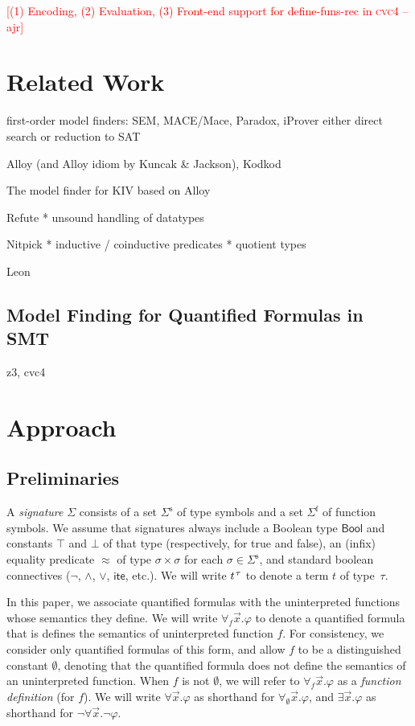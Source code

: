 \documentclass[runningheads,a4paper]{llncs}
\newcommand{\con}[1]{\mathsf{#1}}
\newcommand{\cvc}{\textsc{cvc}{\small 4}\xspace}
\newcommand{\teq}{\approx}
\newcommand{\ssorts}[1]{#1^\mathrm{s}}
\newcommand{\sfuns}[1]{#1^\mathrm{f}}
\newcommand{\Bool}{\con{Bool}}
\newcommand{\ltrue}{\top}
\newcommand{\lfalse}{\bot}
\newcommand{\lite}{\con{ite}}
\newcommand{\forallf}[1]{\forall_{#1}}
\newcommand{\fnull}{\emptyset}
\newcommand{\rem}[1]{\textcolor{red}{[#1]}}
\newcommand{\ajr}[1]{\rem{#1 --ajr}}
\newcommand{\vthinspace}{\kern+0.083333em}
\newcommand{\typ}[1]{^{\vthinspace #1}}
\begin{document}
\ajr{(1) Encoding, (2) Evaluation, (3) Front-end support for define-funs-rec in \cvc}

\section{Related Work}

first-order model finders: SEM, MACE/Mace, Paradox, iProver
  either direct search or reduction to SAT

Alloy (and Alloy idiom by Kuncak \& Jackson), Kodkod

The model finder for KIV based on Alloy

Refute
  * unsound handling of datatypes

Nitpick
  * inductive / coinductive predicates
  * quotient types

Leon

\subsection{Model Finding for Quantified Formulas in SMT}

z3, cvc4


\section{Approach}

\subsection{Preliminaries}
\label{sec:prelim}

A \emph{signature} $\Sigma$ consists of 
a set $\ssorts{\Sigma}$ of type symbols and
a set $\sfuns{\Sigma}$ of function symbols.
We assume that signatures always include a Boolean type $\Bool$ and constants 
$\ltrue$ and $\lfalse$ of that type (respectively, for true and false), 
an (infix) equality predicate $\teq$ of type $\sigma \times \sigma$ for each $\sigma \in \ssorts{\Sigma}$,
and standard boolean connectives ($\neg$, $\wedge$, $\vee$, $\lite$, etc.).
We will write $t\typ{\tau}$ to denote a term $t$ of type~$\tau$.

In this paper, we associate quantified formulas with the uninterpreted functions whose semantics they define.
We will write $\forallf{f} \vec x. \varphi$ to denote a quantified formula that is defines the semantics of uninterpreted function $f$.
For consistency, we consider only quantified formulas of this form, 
and allow $f$ to be a distinguished constant $\fnull$, 
denoting that the quantified formula does not define the semantics of an uninterpreted function.
When $f$ is not $\fnull$, we will refer to $\forallf{f} \vec x. \varphi$ as a \emph{function definition} (for $f$).
We will write $\forall \vec x. \varphi$ as shorthand for $\forallf{\fnull} \vec x. \varphi$,
and $\exists \vec x. \varphi$ as shorthand for $\neg \forall \vec x. \neg \varphi$.
\end{document}
